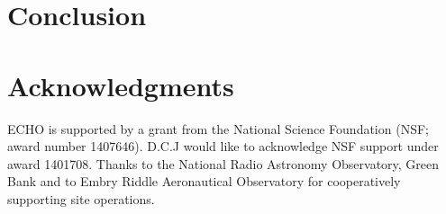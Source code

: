 \documentclass[preprint2]{aastex}
\begin{document}
\section{Conclusion}


\section{Acknowledgments}{

ECHO is supported by a grant from the National Science Foundation (NSF; award number 1407646). D.C.J would like to acknowledge NSF support  under award 1401708.
Thanks to the National Radio Astronomy Observatory, Green Bank and to Embry Riddle Aeronautical Observatory for cooperatively supporting site operations.
}




\end{document}
